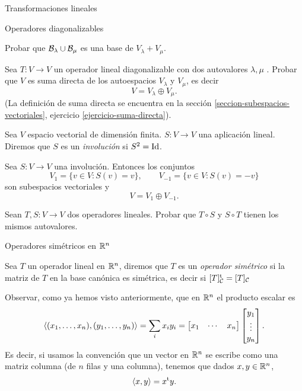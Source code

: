 \begin{chapter}{Transformaciones lineales}
\begin{section}{Operadores diagonalizables}
\begin{enumex}
            Probar que $\mathcal{B}_\lambda \cup \mathcal{B}_\mu$ es una base de $V_\lambda + V_\mu$. 
            \item Sea $T: V \to V$ un operador lineal diagonalizable con dos autovalores  $\lambda, \mu$ . Probar que $V$  es suma directa de los autoespacios $V_{\lambda}$  y $V_\mu$,  es decir
            $$
            V = V_{\lambda} \oplus V_{\mu}.
            $$
            (La definición de suma directa se encuentra en la sección \ref{seccion-subespacios-vectoriales},  ejercicio \ref{ejercicio-suma-directa}).  
            
            \item Sea $V$ espacio vectorial de dimensión finita. $S:V \to V$ una aplicación lineal. Diremos que $S$ es un \textit{involución} si $S^2 = \operatorname{Id}$.
	
			Sea $S: V \to V$ una involución. Entonces los conjuntos
			$$
			V_1 =\{v\in V:S(v)=v\}, \qquad V_{-1} =\{v\in V:S(v)=-v\}
			$$ 
			son subespacios vectoriales y 
			$$
			V = V_1 \oplus V_{-1}.
            $$
            
            \item Sean $T,S: V \to V$ dos operadores lineales. Probar que $T\circ S$ y $S \circ T$ tienen los mismos autovalores.  
            
          
        \end{enumex}
        \end{section}
    
    
        
    

\begin{section}{Operadores simétricos en $\mathbb R^n$}\label{seccion-operadores-simetricos-rn}
    
    \begin{definicion}
        Sea $T$ un operador lineal  en $\mathbb R^n$,  diremos que $T$ es un \textit{operador simétrico} si la matriz de $T$  en la base canónica es simétrica, es decir si 
        $[T]_{\mathcal{C}}^{{\operatorname{t}}} = [T]_{\mathcal{C}}$
    \end{definicion}
    
    
    Observar, como ya hemos visto anteriormente,  que en $\mathbb R^n$ el producto escalar es 
    \begin{equation*}
        \langle (x_1,\ldots,x_n),(y_1,\ldots,y_n)  \rangle = \sum_i x_iy_i = \begin{bmatrix} x_1& \cdots &x_n\end{bmatrix}\begin{bmatrix} y_1 \\ \vdots \\ y_n \end{bmatrix}.
    \end{equation*}
    Es decir, si usamos la convención que un vector en $\mathbb R^n$  se escribe como una matriz columna (de $n$ filas y una columna),  tenemos que dados $x,y \in \mathbb R^n$, 
    \begin{equation*}
        \langle x,y \rangle = x^{\operatorname{t}} y.
    \end{equation*}
    

\end{section}
\end{chapter}
